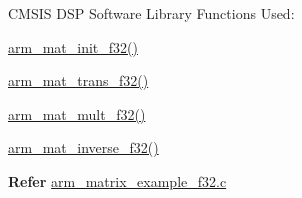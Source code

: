 \begin{DoxyParagraph}{C\-M\-S\-I\-S D\-S\-P Software Library Functions Used\-:}

\end{DoxyParagraph}
\begin{DoxyParagraph}{}

\begin{DoxyItemize}
\item \hyperlink{group___matrix_init_ga11e3dc41592a6401c13182fef9416a27}{arm\-\_\-mat\-\_\-init\-\_\-f32()}
\item \hyperlink{group___matrix_trans_gad7dd9f108429da13d3864696ceeec789}{arm\-\_\-mat\-\_\-trans\-\_\-f32()}
\item \hyperlink{group___matrix_mult_ga917bf0270310c1d3f0eda1fc7c0026a0}{arm\-\_\-mat\-\_\-mult\-\_\-f32()}
\item \hyperlink{group___matrix_inv_ga542be7aabbf7a2297a4b62cf212910e3}{arm\-\_\-mat\-\_\-inverse\-\_\-f32()}
\end{DoxyItemize}
\end{DoxyParagraph}
{\bfseries  Refer } \hyperlink{arm_matrix_example_f32_8c-example}{arm\-\_\-matrix\-\_\-example\-\_\-f32.\-c} 
